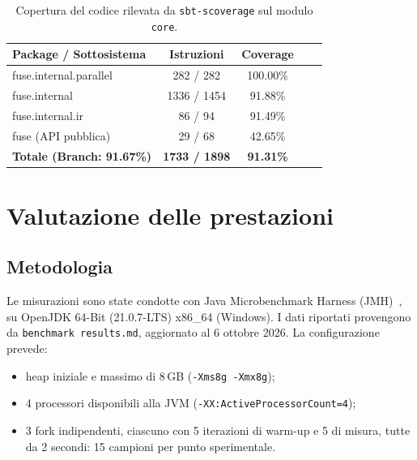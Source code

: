 \documentclass[a4paper,11pt]{report}
\theoremstyle{definition}
\begin{document}
\begin{table}[htbp]
  \centering
  \caption{Copertura del codice rilevata da \texttt{sbt-scoverage} sul modulo \texttt{core}.}
  \label{tab:coverage}
  \vspace{2mm}
  \small
  \begin{tabular}{lcccc}
    \toprule
    \textbf{Package / Sottosistema}   & \textbf{Istruzioni}  & \textbf{Coverage} \\
    \midrule
    \textsf{fuse.internal.parallel}   & 282 / 282            & 100.00\%          \\
    \textsf{fuse.internal}            & 1336 / 1454          & 91.88\%           \\
    \textsf{fuse.internal.ir}         & 86 / 94              & 91.49\%           \\
    \textsf{fuse} (API pubblica)      & 29 / 68              & 42.65\%           \\
    \midrule
    \textbf{Totale (Branch: 91.67\%)} & \textbf{1733 / 1898} & \textbf{91.31\%}  \\
    \bottomrule
  \end{tabular}
\end{table}

\section{Valutazione delle prestazioni}
\label{sec:valutazione-prestazioni}

\subsection{Metodologia}
\label{subsec:bench-metodologia}

Le misurazioni sono state condotte con Java Microbenchmark Harness (JMH)~\cite{jmh}, su OpenJDK 64-Bit (21.0.7-LTS) x86\_64 (Windows). I dati riportati provengono da \texttt{benchmark results.md}, aggiornato al 6 ottobre 2026. La configurazione prevede:
\begin{itemize}
  \item heap iniziale e massimo di 8\,GB (\texttt{-Xms8g -Xmx8g});
  \item 4 processori disponibili alla JVM (\texttt{-XX:ActiveProcessorCount=4});
  \item 3 fork indipendenti, ciascuno con 5 iterazioni di warm-up e 5 di misura, tutte da 2 secondi: 15 campioni per punto sperimentale.
\end{itemize}
\end{document}
